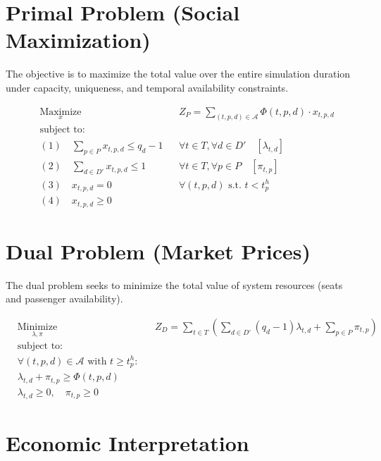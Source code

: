 \documentclass[12pt]{article}
\begin{document}
\section{Primal Problem (Social Maximization)}

The objective is to maximize the total value over the entire simulation duration under capacity, uniqueness, and temporal availability constraints.

\begin{equation*}
\begin{aligned}
& \underset{x}{\text{Maximize}} && Z_P = \sum_{(t,p,d) \in \mathcal{A}} \Phi(t, p, d) \cdot x_{t,p,d} \\
& \text{subject to:} && \\
& (1) \quad \sum_{p \in P} x_{t,p,d} \leq q_d - 1 && \forall t \in T, \forall d \in D' \quad [\lambda_{t,d}] \\
& (2) \quad \sum_{d \in D'} x_{t,p,d} \leq 1 && \forall t \in T, \forall p \in P \quad [\pi_{t,p}] \\
& (3) \quad x_{t,p,d} = 0 && \forall (t,p,d) \text{ s.t. } t < t_p^h \\
& (4) \quad x_{t,p,d} \geq 0 &&
\end{aligned}
\end{equation*}

\section{Dual Problem (Market Prices)}

The dual problem seeks to minimize the total value of system resources (seats and passenger availability).

\begin{equation*}
\begin{aligned}
& \underset{\lambda, \pi}{\text{Minimize}} && Z_D = \sum_{t \in T} \left( \sum_{d \in D'} (q_d - 1) \lambda_{t,d} + \sum_{p \in P} \pi_{t,p} \right) \\
& \text{subject to:} && \\
& \forall (t, p, d) \in \mathcal{A} \text{ with } t \geq t_p^h: && \\
& \lambda_{t,d} + \pi_{t,p} \geq \Phi(t, p, d) \\
& \lambda_{t,d} \geq 0, \quad \pi_{t,p} \geq 0
\end{aligned}
\end{equation*}

\section{Economic Interpretation}
\end{document}
